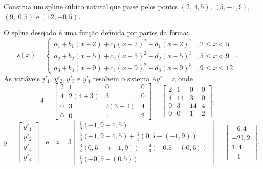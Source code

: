 \begin{ex}Construa um spline cúbico natural que passe pelos pontos $(2,~4,5)$, $(5,-1,9)$, $(9,~0,5)$ e $(12,-0,5)$.
\end{ex}
\begin{sol}
O spline desejado é uma função definida por partes da forma:
\begin{equation}
	s(x)=\left\{\begin{array}{ll}
		a_1+b_1(x-2)+c_1(x-2)^2+d_1(x-2)^3 &, 2\leq x <5\\
	    a_2+b_2(x-5)+c_2(x-5)^2+d_2(x-5)^3 &, 5\leq x <9\\
	    a_3+b_3(x-9)+c_3(x-9)^2+d_3(x-9)^3 &, 9\leq x \leq 12
	\end{array}\right..  
\end{equation}
As variáveis $y'_1$, $y'_2$, $y'_3$ e $y'_4$ resolvem o sistema $Ay' = z$, onde
\begin{equation*}
	A = \begin{bmatrix}
		2 &1&0&0 \\
		4&2(4+3)&3&0\\
		0&3&2(3+4)&4\\
		0&0&1&2
	\end{bmatrix} = \begin{bmatrix}
		2 &1&0&0 \\
		4&14&3&0\\
		0&3&14&4\\
		0&0&1&2
	\end{bmatrix}  ,
\end{equation*}
\begin{equation*}
	y = \begin{bmatrix}
		y'_1\\
		y'_2\\
		y'_3\\
		y'_4
	\end{bmatrix} \quad \text{e}\quad
	z = 3\begin{bmatrix}
		\frac{1}{3}(-1,9-4,5)\\
		\frac{4}{3}(-1,9-4,5)+\frac{3}{4}(0,5-(-1,9))\\
		\frac{3}{4}(0,5-(-1,9))+\frac{4}{3}(-0.5-(0,5))\\
		\frac{1}{3}(-0,5-(0.5))
	\end{bmatrix} = \begin{bmatrix}
		-6,4\\
		-20,2\\
		1,4\\
		-1
	\end{bmatrix} . 
\end{equation*}

\end{sol}
